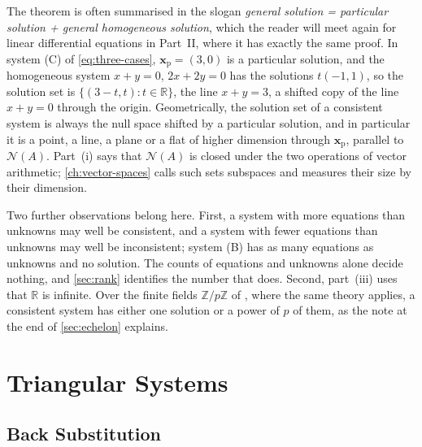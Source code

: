 The theorem is often summarised in the slogan \emph{general solution = particular solution + general homogeneous solution}, which the reader will meet again for linear differential equations in Part~II, where it has exactly the same proof. In system (C) of \eqref{eq:three-cases}, $\mathbf x_{\mathrm p}=(3,0)$ is a particular solution, and the homogeneous system $x+y=0$, $2x+2y=0$ has the solutions $t(-1,1)$, so the solution set is $\{(3-t,t): t\in\mathbb R\}$, the line $x+y=3$, a shifted copy of the line $x+y=0$ through the origin. Geometrically, the solution set of a consistent system is always the null space shifted by a particular solution, and in particular it is a point, a line, a plane or a flat of higher dimension through $\mathbf x_{\mathrm p}$, parallel to $\mathcal N(A)$. Part~(i) says that $\mathcal N(A)$ is closed under the two operations of vector arithmetic; \cref{ch:vector-spaces} calls such sets subspaces and measures their size by their dimension.

Two further observations belong here. First, a system with more equations than unknowns may well be consistent, and a system with fewer equations than unknowns may well be inconsistent; system (B) has as many equations as unknowns and no solution. The counts of equations and unknowns alone decide nothing, and \cref{sec:rank} identifies the number that does. Second, part~(iii) uses that $\mathbb R$ is infinite. Over the finite fields $\mathbb Z/p\mathbb Z$ of , where the same theory applies, a consistent system has either one solution or a power of $p$ of them, as the note at the end of \cref{sec:echelon} explains.

\section{Triangular Systems}
\label{sec:triangular-systems}

\subsection{Back Substitution}

